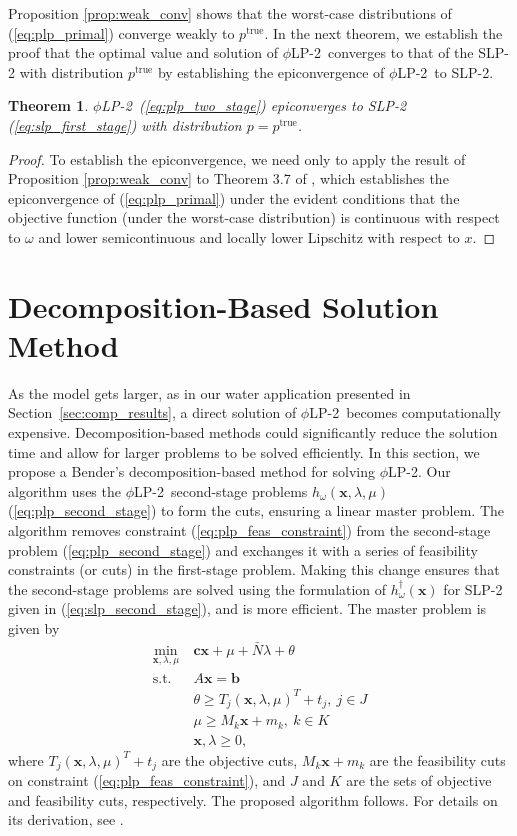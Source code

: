 \documentclass[11pt]{article}
\newcommand{\x}{\mathbf{x}}
\renewcommand{\c}{\mathbf{c}}
\renewcommand{\b}{\mathbf{b}}
\newcommand{\ptrue}{p^{\text{true}}}
\newtheorem{theorem}{Theorem}
\newcommand{\st}{\mbox{s.t.}}
\newcommand{\plp}{$\phi$LP-2}
\begin{document}
Proposition \ref{prop:weak_conv} shows that the worst-case distributions of (\ref{eq:plp_primal}) converge weakly to $\ptrue$.
In the next theorem, we establish the proof that the optimal value and solution of \plp\ converges to that of the SLP-2 with distribution $\ptrue$ by establishing the epiconvergence of \plp\ to SLP-2.
\begin{theorem}
	\plp\ (\ref{eq:plp_two_stage}) epiconverges to SLP-2 (\ref{eq:slp_first_stage}) with distribution $p = \ptrue$.
\end{theorem}

\begin{proof}
	To establish the epiconvergence, we need only to apply the result of Proposition \ref{prop:weak_conv} to Theorem 3.7 of \cite{dupacova1988asymptotic}, which establishes the epiconvergence of (\ref{eq:plp_primal}) under the evident conditions that the objective function (under the worst-case distribution) is continuous with respect to $\omega$ and lower semicontinuous and locally lower Lipschitz with respect to $x$.
\end{proof}

\section{Decomposition-Based Solution Method} \label{sec:soln_algorithm}

As the model gets larger, as in our water application presented in Section~\ref{sec:comp_results}, a direct solution of \plp\ becomes computationally expensive. 
Decomposition-based methods could significantly reduce the solution time and allow for larger problems to be solved efficiently. In this section, we propose a Bender's decomposition-based method for solving \plp.
Our algorithm uses the \plp\ second-stage problems $h_\omega(\x,\lambda,\mu)$ (\ref{eq:plp_second_stage}) to form the cuts, ensuring a linear master problem.
The algorithm removes constraint (\ref{eq:plp_feas_constraint}) from the second-stage problem (\ref{eq:plp_second_stage}) and exchanges it with a series of feasibility constraints (or cuts) in the first-stage problem.
Making this change ensures that the second-stage problems are solved using the formulation of $h^\dagger_\omega(\x)$ for SLP-2 given in  (\ref{eq:slp_second_stage}), and is more efficient.
The master problem is given by
\begin{align}
	\min_{\x,\lambda,\mu} \ & \c\x + \mu + \bar{N}\lambda + \theta \label{eq:master_problem}\\
	\st \ & A\x = \b \nonumber \\
	& \theta \geq T_j (\x,\lambda,\mu)^T + t_j, \ j \in J \nonumber \\
	& \mu \geq M_k \x + m_k, \ k \in K \nonumber \\
	& \x,\lambda \geq 0, \nonumber
\end{align}
where $T_j (\x,\lambda,\mu)^T + t_j$ are the objective cuts, $M_k \x + m_k$ are the feasibility cuts on constraint (\ref{eq:plp_feas_constraint}), and $J$ and $K$ are the sets of objective and feasibility cuts, respectively.
The proposed algorithm follows.
For details on its derivation, see \cite{love2013likelihood}.
\end{document}
